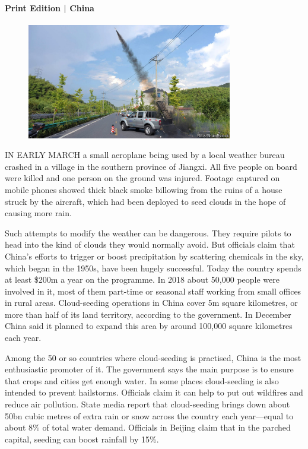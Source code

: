 \documentclass{article}
\begin{document}
\paragraph{Print Edition | China  \quad \color{gray}{Mar 27th 2021 }}
\begin{figure}[h]
\centering
\includegraphics[width=0.8\textwidth]{images/20210327_CNP002_0.jpg}
\end{figure}
\lettrine{I}N EARLY MARCH a small aeroplane being used by a local weather bureau crashed in a village in the southern province of Jiangxi. All five people on board were killed and one person on the ground was injured. Footage captured on mobile phones showed thick black smoke billowing from the ruins of a house struck by the aircraft, which had been deployed to seed clouds in the hope of causing more rain. 

Such attempts to modify the weather can be dangerous. They require pilots to head into the kind of clouds they would normally avoid. But officials claim that China's efforts to trigger or boost precipitation by scattering chemicals in the sky, which began in the 1950s, have been hugely successful. Today the country spends at least \$200m a year on the programme. In 2018 about 50,000 people were involved in it, most of them part-time or seasonal staff working from small offices in rural areas. Cloud-seeding operations in China cover 5m square kilometres, or more than half of its land territory, according to the government. In December China said it planned to expand this area by around 100,000 square kilometres each year. 

Among the 50 or so countries where cloud-seeding is practised, China is the most enthusiastic promoter of it. The government says the main purpose is to ensure that crops and cities get enough water. In some places cloud-seeding is also intended to prevent hailstorms. Officials claim it can help to put out wildfires and reduce air pollution. State media report that cloud-seeding brings down about 50bn cubic metres of extra rain or snow across the country each year---equal to about 8\% of total water demand. Officials in Beijing claim that in the parched capital, seeding can boost rainfall by 15\%. 
\end{document}
